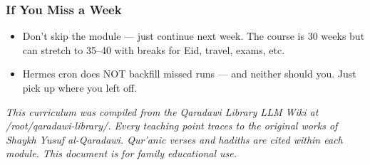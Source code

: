 \documentclass[11pt,a4paper]{article}
\begin{document}
\subsubsection*{If You Miss a Week}
\begin{itemize}
\item Don't skip the module --- just continue next week. The course is 30 weeks but can stretch to 35–40 with breaks for Eid, travel, exams, etc.
\item Hermes cron does NOT backfill missed runs --- and neither should you. Just pick up where you left off.
\end{itemize}


\vspace{6pt}\noindent{\color{border}\rule{\textwidth}{0.5pt}}\vspace{6pt}

\textit{This curriculum was compiled from the Qaradawi Library LLM Wiki at /root/qaradawi-library/. Every teaching point traces to the original works of Shaykh Yusuf al-Qaradawi. Qur'anic verses and hadiths are cited within each module. This document is for family educational use.}
\end{document}
